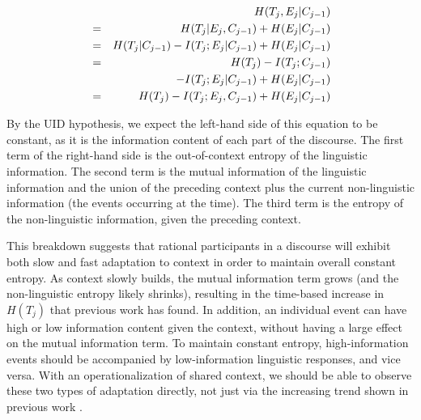\documentclass[11pt,letterpaper]{article}
\begin{document}
\begin{eqnarray}
\nonumber &&\hspace*{-3em}H(T_j,E_j|C_{j-1}) \\
\nonumber &=& H(T_j|E_j,C_{j-1}) + H(E_j|C_{j-1}) \\
\nonumber                    &=& H(T_j|C_{j-1}) - I(T_j;E_j|C_{j-1}) + H(E_j|C_{j-1}) \\
\nonumber                    &=& H(T_j) - I(T_j;C_{j-1}) \\
\nonumber                    && \quad - I(T_j;E_j|C_{j-1}) + H(E_j|C_{j-1}) \\
\label{eq:joint-entropy}     &=& H(T_j) - I(T_j;E_j,C_{j-1}) + H(E_j|C_{j-1})
\end{eqnarray}

By the UID hypothesis, we expect the left-hand side of this equation to be constant, as it is the information content of each part of the discourse.  The first term of the right-hand side is the out-of-context entropy of the linguistic information. The second term is the mutual information of the linguistic information and the union of the preceding context plus the current non-linguistic information (the events occurring at the time).  The third term is the entropy of the non-linguistic information, given the preceding context.

This breakdown suggests that rational participants in a discourse will exhibit both slow and fast adaptation to context in order to maintain overall constant entropy.  As context slowly builds, the mutual information term grows (and the non-linguistic entropy likely shrinks), resulting in the time-based increase in $H(T_j)$ that previous work has found.  In addition, an individual event can have high or low information content given the context, without having a large effect on the mutual information term.  To maintain constant entropy, high-information events should be accompanied by low-information linguistic responses, and vice versa.  With an operationalization of shared context, we should be able to observe these two types of adaptation directly, not just via the increasing trend shown in previous work \cite{genzel2002,qian2012}.  
\end{document}
